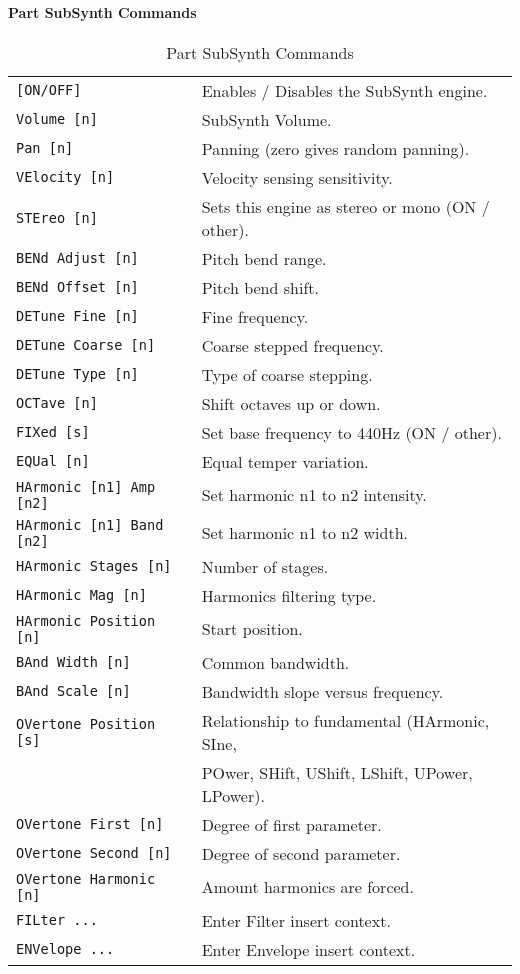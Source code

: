 \paragraph{Part SubSynth Commands}
\label{paragraph:command_line_part_subsynth_commands}

   \begin{table}[H]
      \centering
      \caption{Part SubSynth Commands}
      \label{table:yoshimi_part_subsynth_commands}
      \begin{tabular}{l l}

\texttt{[ON/OFF]} &
   Enables / Disables the SubSynth engine. \\
\texttt{Volume [n]} &
   SubSynth Volume.  \\
\texttt{Pan [n]} &
   Panning (zero gives random panning).\\
\texttt{VElocity [n]} &
   Velocity sensing sensitivity. \\
\texttt{STEreo [n]} &
   Sets this engine as stereo or mono (ON / other). \\
\texttt{BENd Adjust [n]} &
   Pitch bend range. \\
\texttt{BENd Offset [n]} &
   Pitch bend shift. \\
\texttt{DETune Fine [n]} &
   Fine frequency.   \\
\texttt{DETune Coarse [n]} &
   Coarse stepped frequency.  \\
\texttt{DETune Type [n]} &
   Type of coarse stepping.   \\
\texttt{OCTave [n]} &
   Shift octaves up or down.  \\
\texttt{FIXed [s]} &
   Set base frequency to 440Hz (ON / other).  \\
\texttt{EQUal [n]} &
   Equal temper variation. \\
\texttt{HArmonic [n1] Amp [n2]} &
   Set harmonic n1 to n2 intensity. \\
\texttt{HArmonic [n1] Band [n2]} &
   Set harmonic n1 to n2 width. \\
\texttt{HArmonic Stages [n]} &
   Number of stages. \\
\texttt{HArmonic Mag [n]} &
   Harmonics filtering type. \\
\texttt{HArmonic Position [n]} &
   Start position. \\
\texttt{BAnd Width [n]} &
   Common bandwidth. \\
\texttt{BAnd Scale [n]} &
   Bandwidth slope versus frequency. \\
\texttt{OVertone Position [s]} &
   Relationship to fundamental (HArmonic, SIne,\\
\texttt{} &
   POwer, SHift, UShift, LShift, UPower, LPower).\\
\texttt{OVertone First [n]} &
   Degree of first parameter. \\
\texttt{OVertone Second [n]} &
   Degree of second parameter.   \\
\texttt{OVertone Harmonic [n]} &
   Amount harmonics are forced.  \\
\texttt{FILter ...} &
   Enter Filter insert context.  \\
\texttt{ENVelope ...} &
   Enter Envelope insert context.   \\


\end{tabular}
\end{table}
